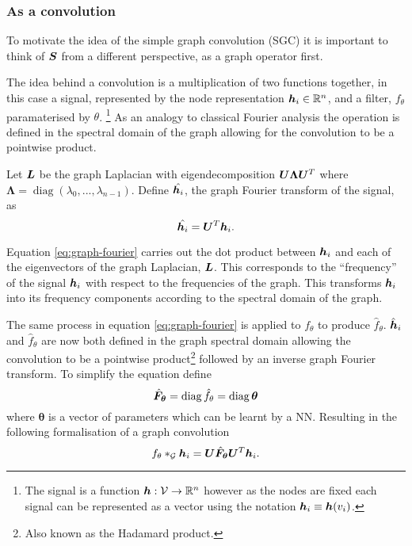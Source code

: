 \subsubsection{As a convolution}
\label{sec:conv}

To motivate the idea of the simple graph convolution (SGC) it is important to think of ${\bm{S}}$ from a different perspective, as a graph operator first.

The idea behind a convolution is a multiplication of two functions together, in this case a signal, represented by the node representation ${\bm{h}}_i \in \mathbb{R}^n$, and a filter, $f_\theta$ paramaterised by $\theta$.
\footnote{The signal is a function ${\bm{h}} : {\mathcal{V}} \to \mathbb{R}^n$ however as the nodes are fixed each signal can be represented as a vector using the notation ${\bm{h}}_i \equiv {\bm{h}}(v_i)$.}
As an analogy to classical Fourier analysis the operation is defined in the spectral domain of the graph allowing for the convolution to be a pointwise product.

Let ${\bm{L}}$ be the graph Laplacian with eigendecomposition ${\bm{U}}\bm{\Lambda}{\bm{U}}^T$ where $\bm{\Lambda} = \operatorname{diag}(\lambda_0, ..., \lambda_{n-1})$. Define $\hat{{\bm{h}}_i}$, the graph Fourier transform of the signal, as
\begin{equation}
    \label{eq:graph-fourier}
    \hat{{\bm{h}}_i} = {\bm{U}}^T{\bm{h}}_i.
\end{equation}

Equation \ref{eq:graph-fourier} carries out the dot product between ${\bm{h}}_i$ and each of the eigenvectors of the graph Laplacian, ${\bm{L}}$.
This corresponds to the ``frequency'' of the signal ${\bm{h}}_i$ with respect to the frequencies of the graph.
This transforms ${\bm{h}}_i$ into its frequency components according to the spectral domain of the graph.

The same process in equation \ref{eq:graph-fourier} is applied to $f_\theta$ to produce $\hat f_\theta$.
$\hat{{\bm{h}}}_i$ and $\hat f_\theta$ are now both defined in the graph spectral domain allowing the convolution to be a pointwise product\footnote{Also known as the Hadamard product.} followed by an inverse graph Fourier transform. To simplify the equation define 
\begin{equation}
    \label{eq:filter1}
    \hat{{\bm{F}}}_{\bm{\theta}} = \operatorname{diag}\hat f_\theta = \operatorname{diag}{\bm{\theta}}
\end{equation}
where $\bm{\theta}$ is a vector of parameters which can be learnt by a NN. Resulting in the following formalisation of a graph convolution
\begin{equation}
    \label{eq:graph-conv}
    f_\theta *_{\mathcal{G}} {\bm{h}}_i = {\bm{U}}\hat{{\bm{F}}}_{\bm{\theta}}{\bm{U}}^T{\bm{h}}_i.
\end{equation}

